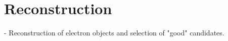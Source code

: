 \chapter{Reconstruction }
{\normalsize - Reconstruction of electron objects and selection of "good" candidates.}


